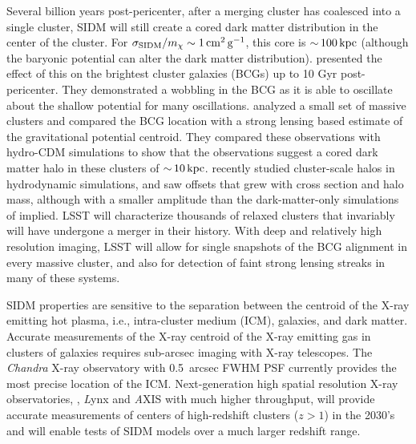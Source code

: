 Several billion years post-pericenter, after a merging cluster has coalesced into a single cluster, SIDM will still create a cored dark matter distribution in the center of the cluster. For $\sigma_{\rm SIDM}/m_\chi \sim 1 \mathrm{\,cm}^{2} \mathrm{\,g}^{-1}$, this core is $ {\sim}\, 100 \mathrm{\,kpc}$ (although the baryonic potential can alter the dark matter distribution). \citet{Kim:2016ujt} presented the effect of this on the brightest cluster galaxies (BCGs) up to 10 Gyr post-pericenter. They demonstrated a wobbling in the BCG as it is able to oscillate about the shallow potential for many oscillations. \citet{1703.07365} analyzed a small set of massive clusters and compared the BCG location with a strong lensing based estimate of the gravitational potential centroid. They compared these observations with hydro-CDM simulations to show that the observations suggest a cored dark matter halo in these clusters of $ {\sim}\, 10\mathrm{\,kpc}$. \citet{Harvey:2018uwf} recently studied cluster-scale halos in hydrodynamic simulations, and saw offsets that grew with cross section and halo mass, although with a smaller amplitude than the dark-matter-only simulations of \citet{Kim:2016ujt} implied. LSST will characterize thousands of relaxed clusters that invariably will have undergone a merger in their history. With deep and relatively high resolution imaging, LSST will allow for single snapshots of the BCG alignment in every massive cluster, and also for detection of faint strong lensing streaks in many of these systems.

SIDM properties are sensitive to the separation between the centroid of the X-ray emitting hot plasma, i.e., intra-cluster medium (ICM), galaxies, and dark matter. Accurate measurements of the X-ray centroid of the X-ray emitting gas in clusters of galaxies requires sub-arcsec imaging with X-ray telescopes. The {\it Chandra} X-ray observatory with 0.5~arcsec FWHM PSF currently provides the most precise location of the ICM. Next-generation high spatial resolution X-ray observatories, \eg, {\textit Lynx} and {\textit AXIS} with much higher throughput, will provide accurate measurements of centers of high-redshift clusters ($z > 1$) in the 2030's and will enable tests of SIDM models over a much larger redshift range.
